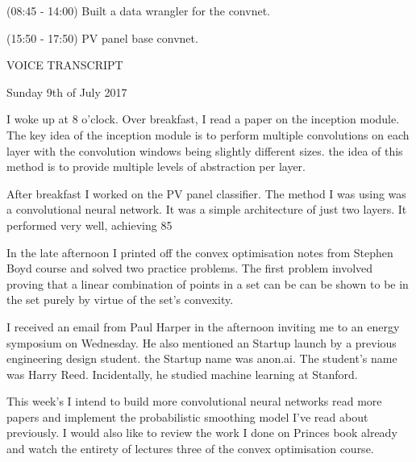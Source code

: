 \documentclass[idxtotoc,hyperref,openany]{labbook} %
\begin{document}
(08:45 - 14:00) Built a data wrangler for the convnet.

(15:50 - 17:50) PV panel base convnet.

VOICE TRANSCRIPT

 Sunday 9th of July 2017

I woke up at 8 o'clock. Over breakfast, I read a paper on the inception module. The key idea of the inception module is to perform multiple convolutions on each layer with the convolution windows being slightly different sizes. the idea of this method is to provide multiple levels of abstraction per layer. 

 After breakfast I worked on the PV panel classifier. The method I was using was a convolutional neural network. It was a simple architecture of just two layers. It performed very well, achieving 85%

 In the late afternoon I printed off the convex optimisation notes from Stephen Boyd course and solved two practice problems. The first problem involved proving that a linear combination of points in a set can be can be shown to be in the set purely by virtue of the set’s convexity. 

I received an email from Paul Harper in the afternoon inviting me to an energy symposium on Wednesday. He also mentioned an Startup launch by a previous engineering design student. 
 the Startup name was anon.ai. The student's name was Harry Reed. Incidentally, he studied machine learning at Stanford.

This week's I intend to build more convolutional neural networks read more papers and implement the probabilistic smoothing model I've read about previously.  I would also like to review the work I done on Princes book already and watch the entirety of lectures three of the convex optimisation course. 
\end{document}
